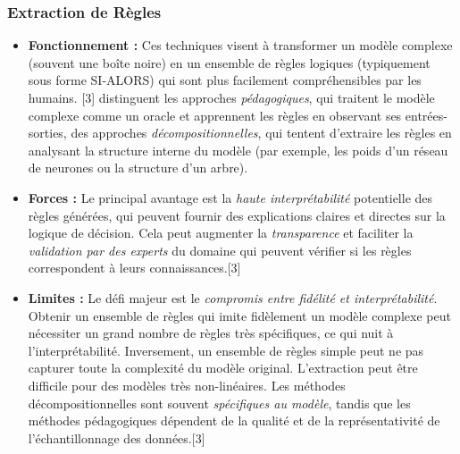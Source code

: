 \documentclass[11pt,a4paper]{article}
\begin{document}
\subsubsection{Extraction de Règles}
\begin{itemize}
    \item \textbf{Fonctionnement :} Ces techniques visent à transformer un modèle complexe (souvent une boîte noire) en un ensemble de règles logiques (typiquement sous forme SI-ALORS) qui sont plus facilement compréhensibles par les humains. \citet{Burkart2021} [3] distinguent les approches \textit{pédagogiques}, qui traitent le modèle complexe comme un oracle et apprennent les règles en observant ses entrées-sorties, des approches \textit{décompositionnelles}, qui tentent d'extraire les règles en analysant la structure interne du modèle (par exemple, les poids d'un réseau de neurones ou la structure d'un arbre).
    \item \textbf{Forces :} Le principal avantage est la \textit{haute interprétabilité} potentielle des règles générées, qui peuvent fournir des explications claires et directes sur la logique de décision. Cela peut augmenter la \textit{transparence} et faciliter la \textit{validation par des experts} du domaine qui peuvent vérifier si les règles correspondent à leurs connaissances.[3]
    \item \textbf{Limites :} Le défi majeur est le \textit{compromis entre fidélité et interprétabilité}. Obtenir un ensemble de règles qui imite fidèlement un modèle complexe peut nécessiter un grand nombre de règles très spécifiques, ce qui nuit à l'interprétabilité. Inversement, un ensemble de règles simple peut ne pas capturer toute la complexité du modèle original. L'extraction peut être difficile pour des modèles très non-linéaires. Les méthodes décompositionnelles sont souvent \textit{spécifiques au modèle}, tandis que les méthodes pédagogiques dépendent de la qualité et de la représentativité de l'échantillonnage des données.[3]
\end{itemize}
\end{document}

